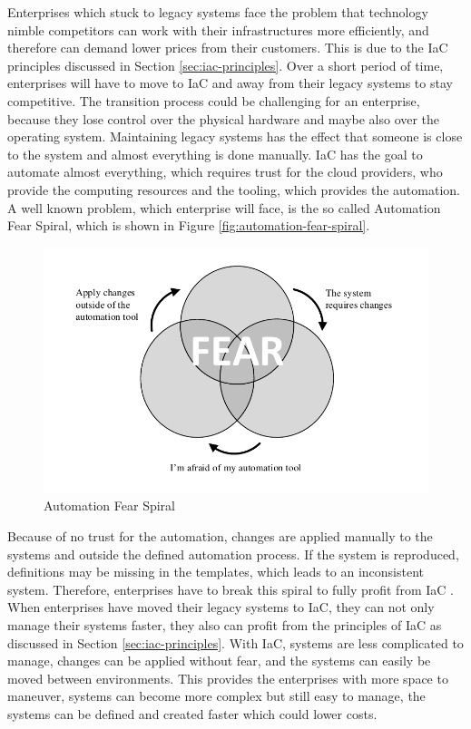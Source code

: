 Enterprises which stuck to legacy systems face the problem that technology nimble competitors can work with their infrastructures more efficiently, and therefore can demand lower prices from their customers. This is due to the IaC principles discussed in Section \ref{sec:iac-principles}. Over a short period of time, enterprises will have to move to IaC and away from their legacy systems to stay competitive. The transition process could be challenging for an enterprise, because they lose control over the physical hardware and maybe also over the operating system. Maintaining legacy systems has the effect that someone is close to the system and almost everything is done manually. IaC has the goal to automate almost everything, which requires trust for the cloud providers, who provide the computing resources and the tooling, which provides the automation. A well known problem, which enterprise will face, is the so called Automation Fear Spiral, which is shown in Figure \vref{fig:automation-fear-spiral}.

\begin{figure}[htbp]
	\centering
	\includegraphics[scale=1]{images/automation-fear-spiral.pdf}
	\caption{Automation Fear Spiral}
	\label{fig:automation-fear-spiral}
\end{figure} 

Because of no trust for the automation, changes are applied manually to the systems and outside the defined automation process. If the system is reproduced, definitions may be missing in the templates, which leads to an inconsistent system. Therefore, enterprises have to break this spiral to fully profit from IaC \cite{Morris2016}. \\

When enterprises have moved their legacy systems to IaC, they can not only manage their systems faster, they also can profit from the principles of IaC as discussed in Section \ref{sec:iac-principles}. With IaC, systems are less complicated to manage, changes can be applied without fear, and the systems can easily be moved between environments. This provides the enterprises with more space to maneuver, systems can become more complex but still easy to manage, the systems can be defined and created faster which could lower costs.    

